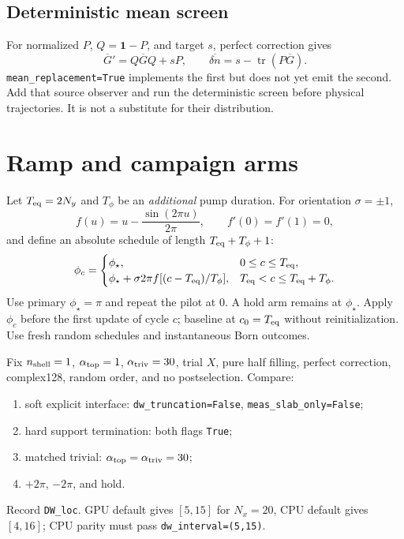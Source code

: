 \documentclass[aps,prb,onecolumn,nofootinbib,superscriptaddress]{revtex4-2}
\newcommand{\tr}{\operatorname{tr}}
\newcommand{\code}[1]{\texttt{#1}}
\begin{document}
\subsection{Deterministic mean screen}

For normalized $P$, $Q=\mathbf{1}-P$, and target $s$, perfect correction gives
\begin{equation}
 \overline G'=Q\overline GQ+sP,\qquad
 \overline{\delta n}=s-\tr(P\overline G).
 \label{eq:mean}
\end{equation}
\code{mean\_replacement=True} implements the first but does not yet emit the
second.  Add that source observer and run the deterministic screen before
physical trajectories.  It is not a substitute for their distribution.

\section{Ramp and campaign arms}
\label{sec:ramp}

Let $T_{\rm eq}=2N_y$ and $T_\phi$ be an \emph{additional} pump duration.  For
orientation $\sigma=\pm1$,
\begin{equation}
 f(u)=u-\frac{\sin(2\pi u)}{2\pi},\qquad f'(0)=f'(1)=0,
\end{equation}
and define an absolute schedule of length $T_{\rm eq}+T_\phi+1$:
\begin{equation}
 \phi_c=\begin{cases}
 \phi_\star,&0\le c\le T_{\rm eq},\\
 \phi_\star+\sigma2\pi f[(c-T_{\rm eq})/T_\phi],
 &T_{\rm eq}<c\le T_{\rm eq}+T_\phi.
 \end{cases}
 \label{eq:schedule}
\end{equation}
Use primary $\phi_\star=\pi$ and repeat the pilot at $0$.  A hold arm remains
at $\phi_\star$.  Apply $\phi_c$ before the first update of cycle $c$; baseline
at $c_0=T_{\rm eq}$ without reinitialization.  Use fresh random schedules and
instantaneous Born outcomes.

Fix $n_{\rm shell}=1$, $\alpha_{\rm top}=1$, $\alpha_{\rm triv}=30$, trial
$X$, pure half filling, perfect correction, complex128, random order, and no
postselection.  Compare:
\begin{enumerate}
 \item soft explicit interface: \code{dw\_truncation=False},
 \code{meas\_slab\_only=False};
 \item hard support termination: both flags \code{True};
 \item matched trivial: $\alpha_{\rm top}=\alpha_{\rm triv}=30$;
 \item $+2\pi$, $-2\pi$, and hold.
\end{enumerate}
Record \code{DW\_loc}.  GPU default gives $[5,15]$ for $N_x=20$, CPU default
gives $[4,16]$; CPU parity must pass \code{dw\_interval=(5,15)}.
\end{document}
